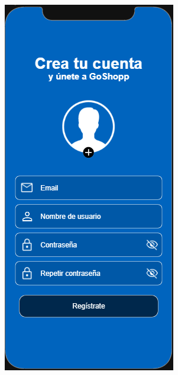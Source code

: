 \documentclass{article}
\begin{document}
\begin{figure}[htbp]
\begin{subfigure}[h]{0.3\textwidth}
    \end{subfigure}
    \hfill
    \begin{subfigure}[h]{0.3\textwidth}
        \includegraphics[width=\textwidth]{imagenes/modelos/registro.png}

\end{subfigure}
\end{figure}
\end{document}
